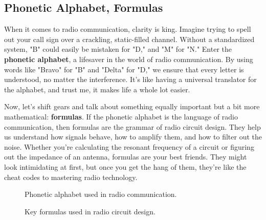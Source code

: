 \subsection{Phonetic Alphabet, Formulas}
\label{subsec:phonetic-formulas}

When it comes to radio communication, clarity is king. Imagine trying to spell out your call sign over a crackling, static-filled channel. Without a standardized system, "B" could easily be mistaken for "D," and "M" for "N." Enter the \textbf{phonetic alphabet}, a lifesaver in the world of radio communication. By using words like "Bravo" for "B" and "Delta" for "D," we ensure that every letter is understood, no matter the interference. It's like having a universal translator for the alphabet, and trust me, it makes life a whole lot easier.

Now, let's shift gears and talk about something equally important but a bit more mathematical: \textbf{formulas}. If the phonetic alphabet is the language of radio communication, then formulas are the grammar of radio circuit design. They help us understand how signals behave, how to amplify them, and how to filter out the noise. Whether you're calculating the resonant frequency of a circuit or figuring out the impedance of an antenna, formulas are your best friends. They might look intimidating at first, but once you get the hang of them, they’re like the cheat codes to mastering radio technology.

\begin{figure}[htbp]
    \centering
    \caption{Phonetic alphabet used in radio communication.}
    \label{fig:phonetic-alphabet}
\end{figure}

\begin{figure}[htbp]
    \centering
    \caption{Key formulas used in radio circuit design.}
    \label{fig:radio-formulas}
\end{figure}

